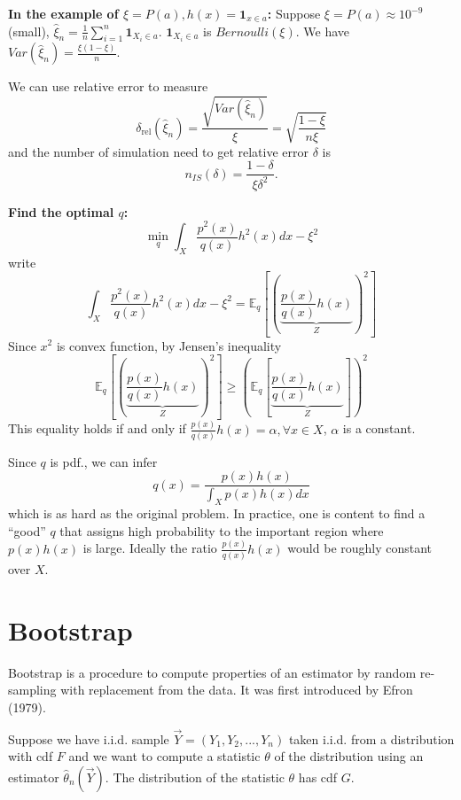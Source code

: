 \documentclass[11pt]{elegantbook}
\begin{document}
\textbf{In the example of $\xi=P(a), h(x)=\mathbf{1}_{x\in a}$:} Suppose $\xi=P(a)\approx 10^{-9}$ (small), $\hat{\xi}_n=\frac{1}{n}\sum_{i=1}^n\mathbf{1}_{X_i\in a}$. $\mathbf{1}_{X_i\in a}$ is $Bernoulli(\xi)$. We have $Var(\hat{\xi}_n)=\frac{\xi(1-\xi)}{n}$.

We can use relative error to measure $$\delta_{\mathrm{rel}}\left(\hat{\xi}_n\right)=\frac{\sqrt{Var(\hat{\xi}_n)}}{\xi}=\sqrt{\frac{1-\xi}{n\xi}}$$
and the number of simulation need to get relative error $\delta$ is $$
n_{I S}(\delta)=\frac{1-\delta} {\xi \delta^2} .
$$

\textbf{Find the optimal $q$:}
$$\min_q\int_X\frac{p^2(x)}{q(x)}h^2(x)dx-\xi^2$$
write $$\int_X\frac{p^2(x)}{q(x)}h^2(x)dx-\xi^2=\mathbb{E}_q\left[\left(\underbrace{\frac{p(x)}{q(x)}h(x)}_{Z}\right)^2\right]$$
Since $x^2$ is convex function, by Jensen's inequality
$$\mathbb{E}_q\left[\left(\underbrace{\frac{p(x)}{q(x)}h(x)}_{Z}\right)^2\right]\geq \left(\mathbb{E}_q\left[\underbrace{\frac{p(x)}{q(x)}h(x)}_{Z}\right]\right)^2$$
This equality holds if and only if $\frac{p(x)}{q(x)}h(x)=\alpha,\forall x\in X$, $\alpha$ is a constant.

Since $q$ is pdf., we can infer $$q(x)=\frac{p(x)h(x)}{\int_Xp(x)h(x)dx}$$
which is as hard as the original problem. In practice, one is content to find a “good” $q$ that assigns high probability to the important region where $p(x)h(x)$ is large. Ideally the ratio $\frac{p(x)}{q(x)}h(x)$ would be roughly constant over $X$.


\chapter{Bootstrap}
Bootstrap is a procedure to compute properties of an estimator by random re-sampling with replacement from the data. It was first introduced by Efron (1979).

Suppose we have i.i.d. sample $\vec{Y}=(Y_1,Y_2,...,Y_n)$ taken i.i.d. from a distribution with cdf $F$ and we want to compute a statistic $\theta$ of the distribution using an estimator $\hat{\theta}_n(\vec{Y})$. The distribution of the statistic $\theta$ has cdf $G$.
\end{document}
